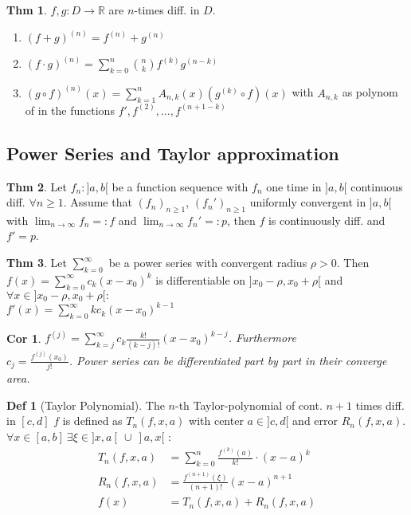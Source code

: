 \documentclass[a4paper, 10pt]{article}
\newtheorem*{corollary}{Cor}
\theoremstyle{definition}
\newtheorem*{theorem}{Thm}
\newtheorem*{definition}{Def}
\theoremstyle{named}
\newcommand{\R}{\mathbb{R}}
\begin{document}
\begin{theorem}
    $f, g: D \to \R$ are $n$-times diff. in $D$.
    \begin{enumerate}
        \item $(f + g)^{(n)} = f^{(n)} + g^{(n)}$
        \item $(f \cdot g)^{(n)} = \sum_{k = 0}^n \binom{n}{k}f^{(k)}g^{(n-k)}$
        \item $(g \circ f)^{(n)}(x) = \sum_{k=1}^n A_{n,k}(x)(g^{(k)} \circ f)(x)$ with $A_{n,k}$ as polynom of in the functions $f', f^{(2)}, \ldots, f^{(n+1-k)}$
    \end{enumerate}
\end{theorem}

\subsection{Power Series and Taylor approximation}
\begin{theorem}
    Let $f_n : ]a, b[$ be a function sequence with $f_n$ one time in $]a, b[$ continuous diff. $\forall n \geq 1$. Assume that $(f_n)_{n \geq 1}$, $(f_n')_{n \geq 1}$ uniformly convergent in $]a, b[$ with $\lim_{n \to \infty} f_n =: f$ and $\lim_{n \to \infty} f_n' =: p$, then $f$ is continuously diff. and $f' = p$.
\end{theorem}

\begin{theorem}
    Let $\sum_{k = 0}^\infty$ be a power series with convergent radius $\rho > 0$. Then $f(x) = \sum_{k = 0}^\infty c_k(x - x_0)^k$ is differentiable on $]x_0 - \rho , x_0 + \rho[$ and $\forall x \in ]x_0 - \rho , x_0 + \rho[:$ \\
    $f'(x) = \sum_{k = 0}^\infty kc_k(x - x_0)^{k - 1}$
\end{theorem}

\begin{corollary}
    $f^{(j)} = \sum_{k = j}^\infty c_k \frac{k!}{(k-j)!}(x - x_0)^{k - j}$. Furthermore \\ $c_j = \frac{f^{(j)}(x_0)}{j!}$. Power series can be differentiated part by part in their converge area.
\end{corollary}

\begin{definition}[Taylor Polynomial]
    The $n$-th Taylor-polynomial of cont. $n + 1$ times diff. in $[c, d]$ $f$ is defined as $T_n(f, x, a)$ with center $a \in ]c, d[$ and error $R_n(f, x, a)$. \\ 
    $\forall x \in [a, b] \ \exists \xi \in ]x, a[ \ \cup \ ]a, x[$ : 
    \begin{align*}
        T_n(f, x, a) &= \sum_{k = 0}^n \frac{f^{(k)}(a)}{k!} \cdot (x - a)^k \\
        R_n(f, x, a) &= \frac{f^{(n+1)}(\xi)}{(n + 1)!}(x-a)^{n+1} \\
        f(x) &= T_n(f, x, a) + R_n(f, x, a)
    \end{align*}
\end{definition}
\end{document}
